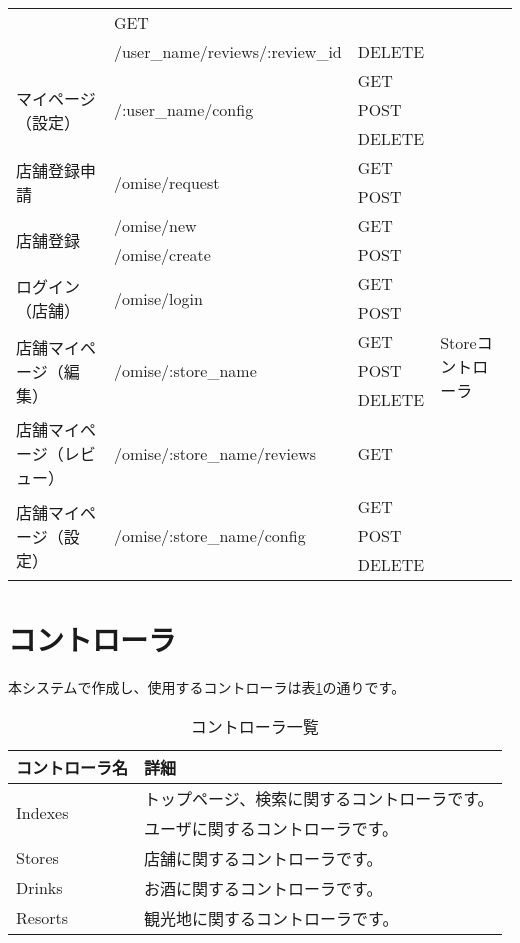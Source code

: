 \documentclass[a4j,titlepage]{jarticle}
\begin{document}
\begin{table}[!htbp]
\begin{center}
\begin{tabular}{|l|l|l|p{4cm}|}
& GET & \\\cline{2-3}
 & /user\_name/reviews/:review\_id & DELETE & \\\cline{1-3}
\multirow{3}{*}{マイページ（設定）} & \multirow{3}{*}{/:user\_name/config}
& GET & \\\cline{3-3}
 & & POST & \\\cline{3-3}
 & & DELETE & \\\hline
 \multirow{2}{*}{店舗登録申請} & \multirow{2}{*}{/omise/request}
 & GET & \multirow{13}{*}{Storeコントローラ} \\\cline{3-3}
  & & POST &\\\cline{1-3}
 \multirow{2}{*}{店舗登録} & /omise/new
 & GET &\\\cline{3-3}
  & /omise/create & POST &\\\cline{1-3}
 \multirow{2}{*}{ログイン（店舗）} & \multirow{2}{*}{/omise/login}
 & GET & \\\cline{3-3}
  & & POST & \\\cline{1-3}
\multirow{3}{*}{店舗マイページ（編集）}& \multirow{3}{*}{/omise/:store\_name}
& GET & \\\cline{3-3}
 & & POST & \\\cline{3-3}
 & & DELETE & \\\cline{1-3}
店舗マイページ（レビュー） & /omise/:store\_name/reviews
& GET & \\\cline{1-3}
\multirow{3}{*}{店舗マイページ（設定）} & \multirow{3}{*}{/omise/:store\_name/config}
& GET & \\\cline{3-3}
 & & POST & \\\cline{3-3}
 & & DELETE & \\\hline
\end{tabular}
\end{center}
\end{table}

\section{コントローラ}
本システムで作成し、使用するコントローラは表\ref{controller}の通りです。

\begin{table}[!htbp]
\caption{コントローラ一覧}
\label{controller}
\small
\begin{center}
\begin{tabular}{|l|p{5cm}|}\hline
コントローラ名 & 詳細 \\\hline\hline
\multirow{2}{*}{Indexes} & トップページ、検索に関するコントローラです。 \\\hline
Users & ユーザに関するコントローラです。 \\\hline
Stores & 店舗に関するコントローラです。 \\\hline
Drinks & お酒に関するコントローラです。 \\\hline
Resorts & 観光地に関するコントローラです。 \\\hline
\end{tabular}
\end{center}
\end{table}
\end{document}
